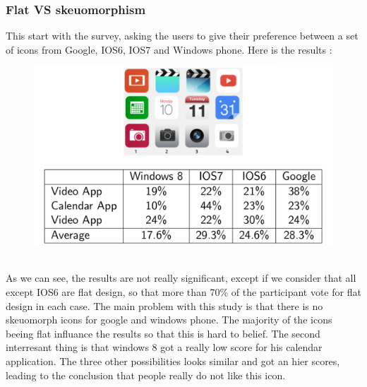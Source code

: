 \documentclass[a4paper,11pt] {article}
\theoremstyle{definition}
\begin{document}
    \subsubsection{Flat VS skeuomorphism\cite{flatVSskeuomorphisme}}
    This start with the survey, asking the users to give their preference between a set of icons from Google, IOS6, IOS7 and Windows phone. Here is the results :\\
    \begin{figure}[h]
    \centering
    \includegraphics[scale=0.3]{fig-report/flatVSskeuomorphism.png}
    \end{figure}\\
As we can see, the results are not really significant, except if we consider that all except IOS6 are flat design, so that more than 70\% of the participant vote for flat design in each case. The main problem with this study is that there is no skeuomorph icons for google and windows phone. The majority of the icons beeing flat influance the results so that this is hard to belief. The second interresant thing is that windows 8 got a really low score for his calendar application. The three other possibilities looks similar and got an hier scores, leading to the conclusion that people really do not like this icon.
\end{document}
